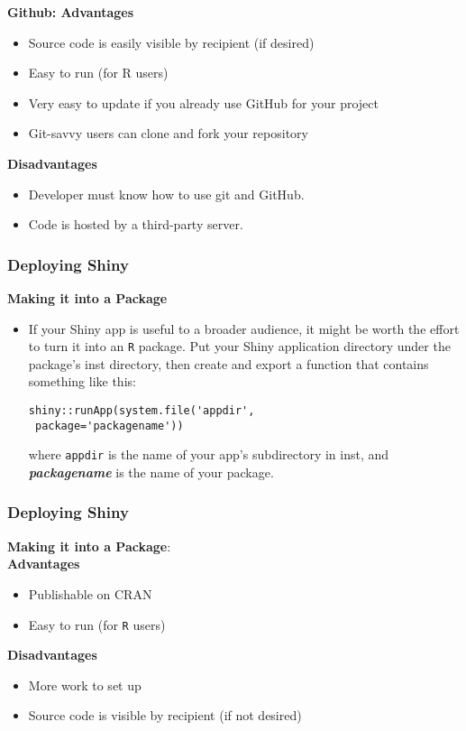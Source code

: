 \documentclass{beamer}
\begin{document}
\begin{frame}
\Large
\textbf{Github: Advantages} \begin{itemize}
\item  Source code is easily visible by recipient (if desired)
\item Easy to run (for R users)
\item Very easy to update if you already use GitHub for your project
\item Git-savvy users can clone and fork your repository
\end{itemize} \textbf{Disadvantages} \begin{itemize}
\item Developer must know how to use git and GitHub.
\item Code is hosted by a third-party server.
\end{itemize}
\end{frame}


\begin{frame}[fragile]
\frametitle{Deploying Shiny}
\textbf{Making it into a Package}
\begin{itemize}
\item If your Shiny app is useful to a broader audience, it might be worth the effort to turn it into an \texttt{R} package. Put your Shiny application directory under the package’s inst directory, then create and export a function that contains something like this:
\begin{framed}
\begin{verbatim}
shiny::runApp(system.file('appdir', 
 package='packagename'))
\end{verbatim}
\end{framed}
where \texttt{appdir} is the name of your app’s subdirectory in inst, and \textbf{\emph{packagename}} is the name of your package.
\end{itemize}
\end{frame}

\begin{frame}
\frametitle{Deploying Shiny}
\textbf{Making it into a Package}:\\ \bigskip
\textbf{Advantages} \begin{itemize}
\item Publishable on CRAN
\item Easy to run (for \texttt{R} users)
\end{itemize} \textbf{Disadvantages} \begin{itemize}
\item More work to set up
\item Source code is visible by recipient (if not desired)
\end{itemize}
\end{frame}
\end{document}
